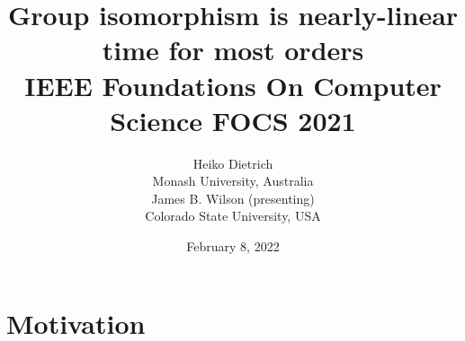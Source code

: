 \documentclass{beamer}
\begin{document}
\title{Group isomorphism is nearly-linear time for most
orders\\ {\small IEEE Foundations On Computer Science FOCS 2021}}
\author{Heiko Dietrich\\ Monash University, Australia\\[10pt] James B. Wilson (presenting)\\ Colorado State University, USA}
\date{February 8, 2022}

\maketitle

\section{Motivation}
\end{document}

